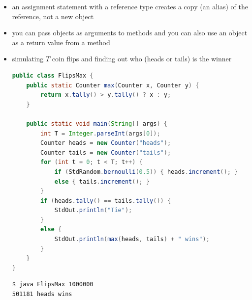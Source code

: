 \documentclass[8pt,a4paper,compress]{beamer}
\begin{document}
\begin{frame}[fragile]
\begin{itemize}
\item an assignment statement with a reference type creates a copy (an alias) of the reference, not a new object

\item you can pass objects as arguments to methods and you can also use an object as a return value from a method

\item simulating $T$ coin flips and finding out who (heads or tails) is the winner
\begin{lstlisting}[language=Java]
public class FlipsMax {
    public static Counter max(Counter x, Counter y) {
        return x.tally() > y.tally() ? x : y;
    }

    public static void main(String[] args) {
        int T = Integer.parseInt(args[0]);
        Counter heads = new Counter("heads");
        Counter tails = new Counter("tails");
        for (int t = 0; t < T; t++) {
            if (StdRandom.bernoulli(0.5)) { heads.increment(); }
            else { tails.increment(); }
        }
        if (heads.tally() == tails.tally()) {
            StdOut.println("Tie");
        }
        else {
            StdOut.println(max(heads, tails) + " wins");
        }
    }
}
\end{lstlisting}

\begin{lstlisting}[language={}]
$ java FlipsMax 1000000
501181 heads wins
\end{lstlisting}
\end{itemize}
\end{frame}
\end{document}
